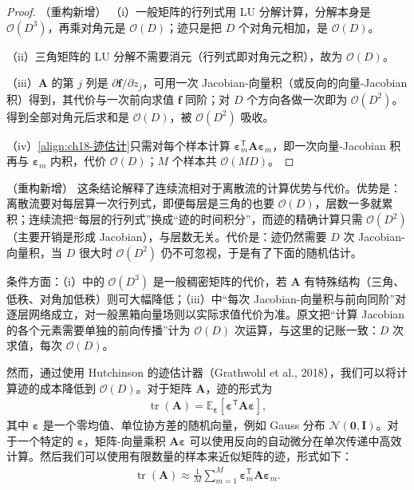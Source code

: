 \documentclass[../../main.tex]{subfiles}
\begin{document}
\begin{proof}（重构新增）
（i）一般矩阵的行列式用 LU 分解计算，分解本身是 $\mathcal{O}(D^{3})$，再乘对角元是 $\mathcal{O}(D)$；迹只是把 $D$ 个对角元相加，是 $\mathcal{O}(D)$。

（ii）三角矩阵的 LU 分解不需要消元（行列式即对角元之积），故为 $\mathcal{O}(D)$。

（iii）$\bm{A}$ 的第 $j$ 列是 $\partial\bm{f}/\partial z_j$，可用一次 Jacobian-向量积（或反向的向量-Jacobian 积）得到，其代价与一次前向求值 $\bm{f}$ 同阶；对 $D$ 个方向各做一次即为 $\mathcal{O}(D^{2})$。得到全部对角元后求和是 $\mathcal{O}(D)$，被 $\mathcal{O}(D^{2})$ 吸收。

（iv）\eqref{align:ch18-迹估计}只需对每个样本计算 $\bm{\varepsilon}_m^{\mathsf T}\bm{A}\bm{\varepsilon}_m$，即一次向量-Jacobian 积再与 $\bm{\varepsilon}_m$ 内积，代价 $\mathcal{O}(D)$；$M$ 个样本共 $\mathcal{O}(MD)$。
\end{proof}

\begin{remark}（重构新增）
这条结论解释了连续流相对于离散流的计算优势与代价。优势是：离散流要对每层算一次行列式，即便每层是三角的也要 $\mathcal{O}(D)$，层数一多就累积；连续流把“每层的行列式”换成“迹的时间积分”，而迹的精确计算只需 $\mathcal{O}(D^{2})$（主要开销是形成 Jacobian），与层数无关。代价是：迹仍然需要 $D$ 次 Jacobian-向量积，当 $D$ 很大时 $\mathcal{O}(D^{2})$ 仍不可忽视，于是有了下面的随机估计。

条件方面：（i）中的 $\mathcal{O}(D^{3})$ 是一般稠密矩阵的代价，若 $\bm{A}$ 有特殊结构（三角、低秩、对角加低秩）则可大幅降低；（iii）中“每次 Jacobian-向量积与前向同阶”对逐层网络成立，对一般黑箱向量场则以实际求值代价为准。原文把“计算 Jacobian 的各个元素需要单独的前向传播”计为 $\mathcal{O}(D)$ 次运算，与这里的记账一致：$D$ 次求值，每次 $\mathcal{O}(D)$。
\end{remark}

然而，通过使用 Hutchinson 的迹估计器（Grathwohl et al., 2018），我们可以将计算迹的成本降低到 $\mathcal{O}(D)$。对于矩阵 $\bm{A}$，迹的形式为
\begin{align}
  \operatorname{tr}(\bm{A})=\mathbb{E}_{\bm{\varepsilon}}\left[\bm{\varepsilon}^{\mathsf T}\bm{A}\bm{\varepsilon}\right],\label{align:ch18-hutchinson}
\end{align}
其中 $\bm{\varepsilon}$ 是一个零均值、单位协方差的随机向量，例如 Gauss 分布 $\mathcal{N}(\bm{0},\bm{I})$。对于一个特定的 $\bm{\varepsilon}$，矩阵-向量乘积 $\bm{A}\bm{\varepsilon}$ 可以使用反向的自动微分在单次传递中高效计算。然后我们可以使用有限数量的样本来近似矩阵的迹，形式如下：
\begin{align}
  \operatorname{tr}(\bm{A})\approx\frac{1}{M}\sum_{m=1}^{M}\bm{\varepsilon}_m^{\mathsf T}\bm{A}\bm{\varepsilon}_m .\label{align:ch18-迹估计}
\end{align}
\end{document}
